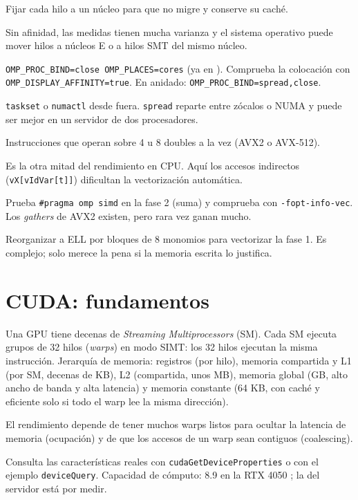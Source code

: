 \que Fijar cada hilo a un núcleo para que no migre y conserve su caché.

\porque Sin afinidad, las medidas tienen mucha varianza y el sistema operativo puede mover hilos a núcleos E o a hilos SMT del mismo núcleo.

\como \texttt{OMP\_PROC\_BIND=close OMP\_PLACES=cores} (ya en ). Comprueba la colocación con \texttt{OMP\_DISPLAY\_AFFINITY=true}. En anidado: \texttt{OMP\_PROC\_BIND=spread,close}.

\alt \texttt{taskset} o \texttt{numactl} desde fuera. \texttt{spread} reparte entre zócalos o NUMA y puede ser mejor en un servidor de dos procesadores.

\que Instrucciones que operan sobre 4 u 8 doubles a la vez (AVX2 o AVX-512).

\porque Es la otra mitad del rendimiento en CPU. Aquí los accesos indirectos (\texttt{vX[vIdVar[t]]}) dificultan la vectorización automática.

\como Prueba \texttt{\#pragma omp simd} en la fase 2 (suma) y comprueba con \texttt{-fopt-info-vec}. Los \emph{gathers} de AVX2 existen, pero rara vez ganan mucho.

\alt Reorganizar a ELL por bloques de 8 monomios para vectorizar la fase 1. Es complejo; solo merece la pena si la memoria escrita lo justifica.

\section{CUDA: fundamentos}\label{tema:cuda}

\que Una GPU tiene decenas de \emph{Streaming Multiprocessors} (SM). Cada SM ejecuta grupos de 32 hilos (\emph{warps}) en modo SIMT: los 32 hilos ejecutan la misma instrucción. Jerarquía de memoria: registros (por hilo), memoria compartida y L1 (por SM, decenas de KB), L2 (compartida, unos MB), memoria global (GB, alto ancho de banda y alta latencia) y memoria constante (64 KB, con caché y eficiente solo si todo el warp lee la misma dirección).

\porque El rendimiento depende de tener muchos warps listos para ocultar la latencia de memoria (ocupación) y de que los accesos de un warp sean contiguos (coalescing).

\como Consulta las características reales con \texttt{cudaGetDeviceProperties} o con el ejemplo \texttt{deviceQuery}. Capacidad de cómputo: 8.9 en la RTX 4050 \pv; la del servidor está por medir.

